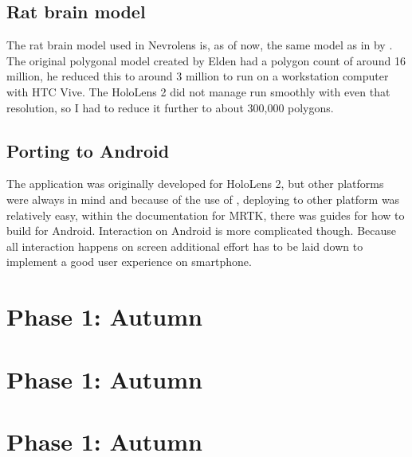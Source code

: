 \subsection*{Rat brain model}
The rat brain model used in Nevrolens is, as of now, the same model as in  by \citet{Elden2017}. The original polygonal model created by Elden had a polygon count of around 16 million, he reduced this to around 3 million to run on a workstation computer with HTC Vive. The HoloLens 2 did not manage run smoothly with even that resolution, so I had to reduce it further to about 300,000 polygons.

\subsection*{Porting to Android}
The application was originally developed for HoloLens 2, but other platforms were always in mind and because of the use of , deploying to other platform was relatively easy, within the documentation for MRTK, there was guides for how to build for Android. Interaction on Android is more complicated though. Because all interaction happens on screen additional effort has to be laid down to implement a good user experience on smartphone.  


\section{Phase 1: Autumn}
\section{Phase 1: Autumn}
\section{Phase 1: Autumn}









